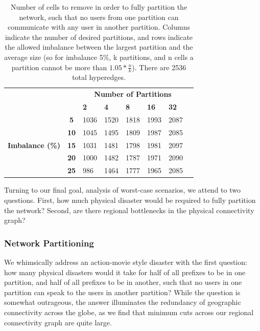     \begin{table}
        \centering
        \begin{tabular}{lc|l|l|l|l|l|l}
            &&\multicolumn{5}{c}{\bf Number of Partitions}\\
            &&{\bf 2}&{\bf 4}&{\bf 8}&{\bf 16}&{\bf 32}\\
            \hline
            \multirow{5}{*}{\begin{sideways}{\bf Imbalance (\%)}\end{sideways}}
            &{\bf 5}&1036&1520&1818&1993&2087\\
            &{\bf 10}&1045&1495&1809&1987&2085\\
            &{\bf 15}&1031&1481&1798&1981&2097\\
            &{\bf 20}&1000&1482&1787&1971&2090\\
            &{\bf 25}&986&1464&1777&1965&2085\\
        \end{tabular}
        \caption[]{\label{tbl:hmetis} Number of cells to remove in order to fully partition the network, such that no users from one partition can communicate with any user in another partition. Columns indicate the number of desired partitions, and rows indicate the allowed imbalance between the largest partition and the average size (so for imbalance 5\%, k partitions, and n cells a partition cannot be more than $1.05 * \frac{n}{k}$). There are 2536 total hyperedges.}
    \end{table}
        
    Turning to our final goal, analysis of worst-case scenarios, we attend to two questions. 
    First, how much physical disaster would be required to fully partition the network?         
    Second, are there regional bottlenecks in the physical connectivity graph?

    \subsubsection*{Network Partitioning}
    We whimsically address an action-movie style disaster with the first question: how many physical disasters would it take for half of all prefixes to be in one partition, and half of all prefixes to be in another, such that no users in one partition can speak to the users in another partition?
    While the question is somewhat outrageous, the answer illuminates the redundancy of geographic connectivity across the globe, as we find that minimum cuts across our regional connectivity graph are quite large.
    
